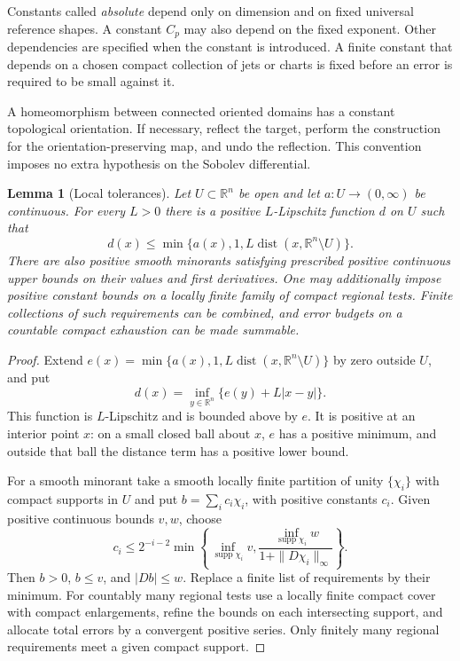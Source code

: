 \documentclass[11pt]{article}
\numberwithin{equation}{section}
\newtheorem{lemma}[theorem]{Lemma}
\theoremstyle{definition}
\theoremstyle{remark}
\newcommand{\R}{\mathbb R}
\DeclareMathOperator{\supp}{supp}
\DeclareMathOperator{\dist}{dist}
\begin{document}
Constants called \emph{absolute} depend only on dimension and on fixed universal reference shapes. A constant $C_p$ may also depend on the fixed exponent. Other dependencies are specified when the constant is introduced. A finite constant that depends on a chosen compact collection of jets or charts is fixed before an error is required to be small against it.

A homeomorphism between connected oriented domains has a constant topological orientation. If necessary, reflect the target, perform the construction for the orientation-preserving map, and undo the reflection. This convention imposes no extra hypothesis on the Sobolev differential.

\begin{lemma}[Local tolerances]\label{pre:local-tolerances}
Let $U\subset\R^n$ be open and let $a:U\to(0,\infty)$ be continuous. For every $L>0$ there is a positive $L$-Lipschitz function $d$ on $U$ such that
\[
 d(x)\le \min\{a(x),1,L\dist(x,\R^n\setminus U)\}.
\]
There are also positive smooth minorants satisfying prescribed positive continuous upper bounds on their values and first derivatives. One may additionally impose positive constant bounds on a locally finite family of compact regional tests. Finite collections of such requirements can be combined, and error budgets on a countable compact exhaustion can be made summable.
\end{lemma}
\begin{proof}
Extend $e(x)=\min\{a(x),1,L\dist(x,\R^n\setminus U)\}$ by zero outside $U$, and put
\[
 d(x)=\inf_{y\in\R^n}\{e(y)+L|x-y|\}.
\]
This function is $L$-Lipschitz and is bounded above by $e$. It is positive at an interior point $x$: on a small closed ball about $x$, $e$ has a positive minimum, and outside that ball the distance term has a positive lower bound.

For a smooth minorant take a smooth locally finite partition of unity $\{\chi_i\}$ with compact supports in $U$ and put $b=\sum_i c_i\chi_i$, with positive constants $c_i$. Given positive continuous bounds $v,w$, choose
\[
 c_i\le 2^{-i-2}\min\left\{
 \inf_{\supp\chi_i}v,
 \frac{\inf_{\supp\chi_i}w}{1+\|D\chi_i\|_\infty}
 \right\}.
\]
Then $b>0$, $b\le v$, and $|Db|\le w$. Replace a finite list of requirements by their minimum. For countably many regional tests use a locally finite compact cover with compact enlargements, refine the bounds on each intersecting support, and allocate total errors by a convergent positive series. Only finitely many regional requirements meet a given compact support.
\end{proof}
\end{document}
